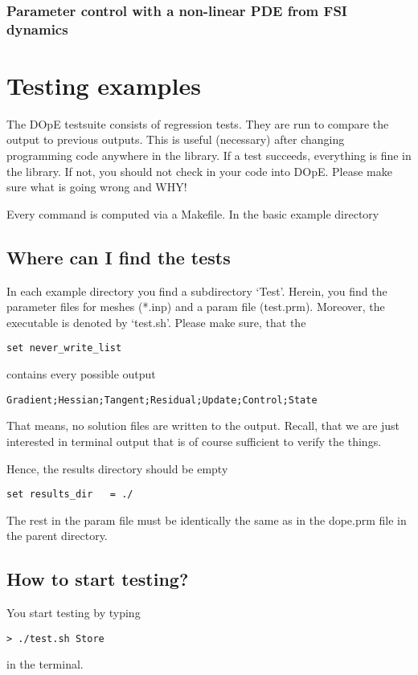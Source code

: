 \documentclass[a4paper,cleardoubleempty]{scrreprt}
\begin{document}
\subsection{Parameter control with a non-linear PDE from FSI dynamics}
\label{OPT_Stat_Param_Nonlin_FSI}
%
\clearpage


\chapter{Testing examples}
The DOpE testsuite consists of regression tests. They are run to compare 
the output to previous outputs. This is useful (necessary) after 
changing programming code anywhere in the library. If a test
succeeds, everything is fine in the library. If not, you should not
check in your code into DOpE. Please make sure what is going wrong and WHY!

Every command is computed via a Makefile. In the basic example 
directory

\section{Where can I find the tests}
In each example directory you find a subdirectory `Test'. Herein, you find 
the parameter files for meshes (*.inp) and a param file (test.prm).
Moreover, the executable is denoted by `test.sh'. Please make sure, that 
the 
\begin{verbatim}
set never_write_list
\end{verbatim}
contains every possible output
\begin{verbatim}
Gradient;Hessian;Tangent;Residual;Update;Control;State
\end{verbatim}
That means, no solution files are written to the output.
Recall, that we are just interested in terminal output that 
is of course sufficient to verify the things.

Hence, the results directory should be empty
\begin{verbatim}
set results_dir   = ./
\end{verbatim}
The rest in the param file must be identically the same as 
in the dope.prm file in the parent directory. 

\section{How to start testing?}
You start testing by typing 
\begin{verbatim}
> ./test.sh Store
\end{verbatim}
in the terminal.
\end{document}
